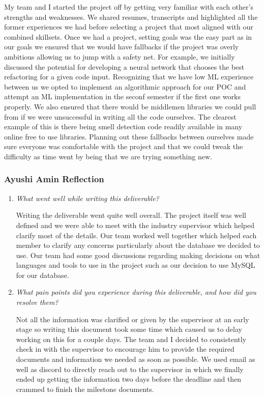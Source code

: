 \documentclass{article}
\begin{document}
\begin{enumerate}
    My team and I started the project off by getting very familiar with each other’s strengths and weaknesses. We shared resumes, transcripts and highlighted all the former experiences we had before selecting a project that most aligned with our combined skillsets. Once we had a project, setting goals was the easy part as in our goals we ensured that we would have fallbacks if the project was overly ambitious allowing us to jump with a safety net. For example, we initially discussed the potential for developing a neural network that chooses the best refactoring for a given code input. Recognizing that we have low ML experience between us we opted to implement an algorithmic approach for our POC and attempt an ML implementation in the seconf semester if the first one works properly. We also ensured that there would be middlemen libraries we could pull from if we were unsuccessful in writing all the code ourselves. The clearest example of this is there being smell detection code readily available in many online free to use libraries. Planning out these fallbacks between ourselves made sure everyone was comfortable with the project and that we could tweak the difficulty as time went by being that we are trying something new.


\end{enumerate}  

\subsubsection*{Ayushi Amin Reflection}

\begin{enumerate}
    \item \textit{What went well while writing this deliverable?}

      Writing the deliverable went quite well overall. The project itself was well defined and we were able to meet with the industry supervisor which helped clarify most of the details. Our team worked well together which helped each member to clarify any concerns particularly about the database we decided to use. Our team had some good discussions regarding making decisions on  what languages and tools to use in the project such as our decision to use MySQL for our database.

    \item \textit{What pain points did you experience during this deliverable, and how did you resolve them?}

    Not all the information was clarified or given by the supervisor at an early stage so writing this document took some time which caused us to delay working on this for a couple days. The team and I decided to consistently check in with the supervisor to encourage him to provide the required documents and information we needed as soon as possible. We used email as well as discord to directly reach out to the supervisor in which we finally ended up getting the information two days before the deadline and then crammed to finish the milestone documents.

\end{enumerate}
\end{document}

